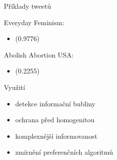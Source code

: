 \documentclass[notheorems,12pt]{beamer}
\begin{document}
\begin{frame}

\end{frame}
\begin{frame}{Příklady tweetů}
    \begin{block}{Everyday Feminism:}
        \begin{itemize}
            \item \begin{footnotesize} \end{footnotesize} (0.9776)
        \end{itemize}
    \end{block}
    \begin{block}{Abolish Abortion USA:}
        \begin{itemize}
            \item \begin{footnotesize}  \end{footnotesize} (0.2255)
        \end{itemize}
    \end{block}
\end{frame}
\begin{frame}{Využití}
\begin{itemize}
    \item detekce informační bubliny
    \item ochrana před homogenitou
    \item komplexnější informovanost
    \item zmírnění preferenčních algoritmů
\end{itemize}
\end{frame}
\end{document}
